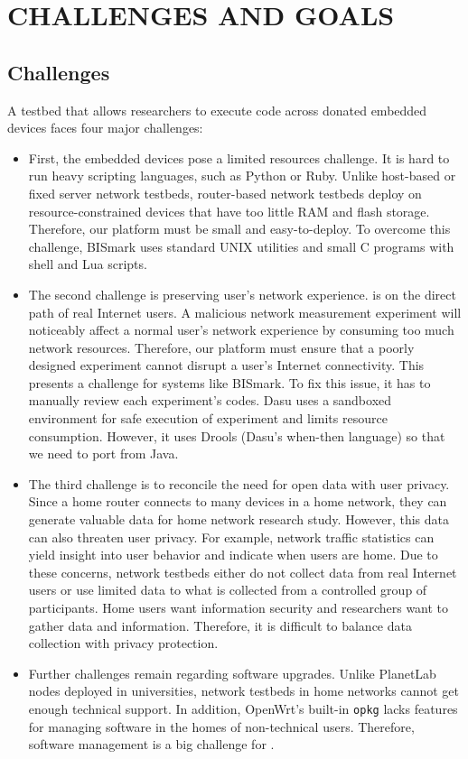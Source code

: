 \chapter{CHALLENGES AND GOALS}
\label{sec.goals_challenges}
\section{Challenges}
\label{ssec.challenges}
A testbed that allows researchers to execute code across donated embedded devices faces four major challenges: 
\begin{itemize}
\item First, the embedded devices pose a limited resources challenge. It is hard to run heavy scripting languages, such as Python or Ruby. Unlike host-based or fixed server network testbeds, router-based network testbeds deploy on resource-constrained devices that have too little RAM and flash storage. Therefore, our platform must be small and easy-to-deploy. To overcome this challenge, BISmark uses standard UNIX utilities and small C programs with shell and Lua scripts.  
\item The second challenge is preserving user's network experience. \sysname is on the direct path of real Internet users. A malicious network measurement experiment will noticeably affect a normal user's network experience by consuming too much network resources. Therefore, our platform must ensure that a poorly designed experiment cannot disrupt a user's Internet connectivity. This presents a challenge for systems like BISmark. To fix this issue, it has to manually review each experiment's codes. Dasu uses a sandboxed environment for safe execution of experiment and limits resource consumption. However, it uses Drools (Dasu's when-then language) so that we need to port from Java.
\item The third challenge is to reconcile the need for open data with user privacy. Since a home router connects to many devices in a home network, they can generate valuable data for home network research study. However, this data can also threaten user privacy. For example, network traffic statistics can yield insight into user behavior and indicate when users are home. Due to these concerns, network testbeds either do not collect data from real Internet users or use limited data to what is collected from a controlled group of participants. Home users want information security and researchers want to gather data and information. Therefore, it is difficult to balance data collection with privacy protection.
\item Further challenges remain regarding software upgrades. Unlike PlanetLab nodes deployed in universities, network testbeds in home networks cannot get enough technical support. In addition, OpenWrt's built-in \texttt{opkg} lacks features for managing software in the homes of non-technical users. Therefore, software management is a big challenge for \sysname.  
\end{itemize}
